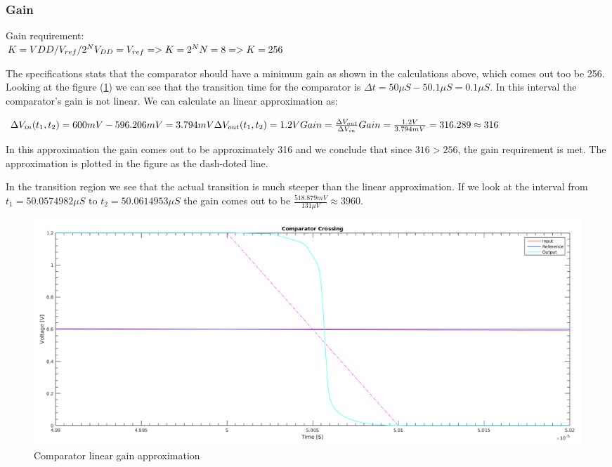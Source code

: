 \documentclass[english, 12pt, a4paper]{ifimaster}
\begin{document}
\subsubsection{Gain}

Gain requirement: \\

\noindent
\begin{math}
K = VDD/V_{ref}/2^N \\
V_{DD} = V_{ref} => K = 2^N \\
N = 8 => K = 256 \\
\end{math}

\noindent
The specifications stats that the comparator should have a minimum gain as shown in the calculations above, which comes out too be 256.
Looking at the figure (\ref{figure:comparator:comparator_linear_approx}) we can see that the transition time for the comparator is \(\Delta t = 50\mu S - 50.1\mu S = 0.1\mu S \).
In this interval the comparator's gain is not linear. We can calculate an linear approximation as:

\noindent
\begin{math}
 \Delta V_{in}(t_1, t_2) = 600mV - 596.206mV = 3.794mV \\
 \Delta V_{out}(t_1, t_2) = 1.2V \\
 Gain = \frac{\Delta V_{out}}{\Delta V_{in}}\\
 Gain = \frac{1.2V}{3.794mV} = 316.289 \approx 316 \\
\end{math}

\noindent
In this approximation the gain comes out to be approximately 316 and we conclude that since \( 316 > 256 \), the gain requirement is met. 
The approximation is plotted in the figure as the dash-doted line.


In the transition region we see that the actual transition is much steeper than the linear approximation. 
If we look at the interval from \(t_1 = 50.0574982\mu S \textrm{ to } t_2 = 50.0614953\mu S\) the gain comes out to be \(\frac{518.879mV}{131\mu V} \approx 3960\). 
\begin{figure}[!ht]
    \centering
    \includegraphics[width=\textwidth]{img/comparator/comparator_crossing_full_with_linear_approx}
    \caption{Comparator linear gain approximation}
    \label{figure:comparator:comparator_linear_approx}
\end{figure}
\end{document}
